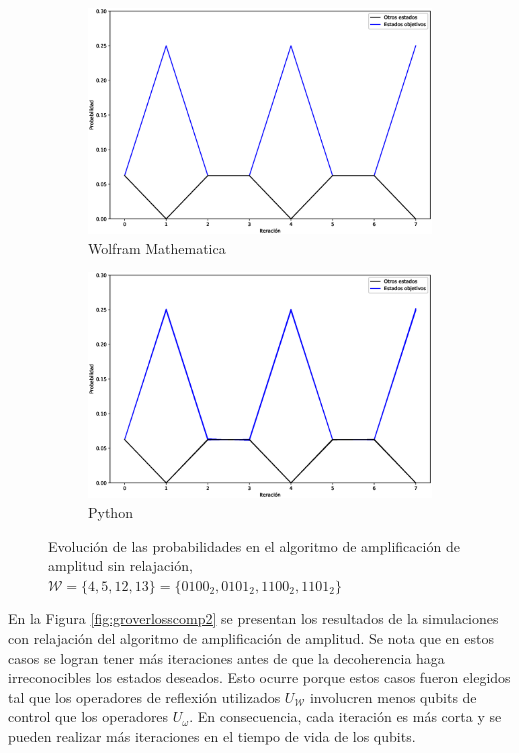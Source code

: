 \begin{figure}[H]
    \centering
    \begin{subfigure}[m]{0.49\textwidth}
        \centering
        \includegraphics[width=0.9\linewidth]{img/grover3M.eps}
        \caption{Wolfram Mathematica}
    \end{subfigure}
    \begin{subfigure}[m]{0.49\textwidth}
        \centering
        \includegraphics[width=0.9\linewidth]{img/grover3lossless.eps}
        \caption{Python}
    \end{subfigure}
    \caption[Evolución de las probabilidades en el algoritmo de amplificación de amplitud sin relajación, $\mathcal{W} = \{4, 5, 12, 13\}$]{Evolución de las probabilidades en el algoritmo de amplificación de amplitud sin relajación, $\mathcal{W} = \{4, 5, 12, 13\} = \{0100_2, 0101_2, 1100_2, 1101_2\}$}
    \label{fig:groverlosslesscomp3}
\end{figure}

En la Figura \ref{fig:groverlosscomp2} se presentan los resultados de la simulaciones con relajación del algoritmo de amplificación de amplitud. Se nota que en estos casos se logran tener más iteraciones antes de que la decoherencia haga irreconocibles los estados deseados. Esto ocurre porque estos casos fueron elegidos tal que los operadores de reflexión utilizados $U_\mathcal{W}$ involucren menos qubits de control que los operadores $U_\omega$. En consecuencia, cada iteración es más corta y se pueden realizar más iteraciones en el tiempo de vida de los qubits.

